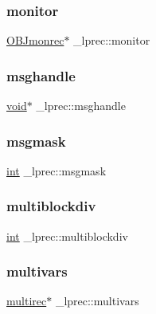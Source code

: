 \subsubsection{\texorpdfstring{monitor}{monitor}}
{\footnotesize\ttfamily \hyperlink{lp__types_8h_a62972be22c422e03180c36608161ece8}{O\+B\+Jmonrec}$\ast$ \+\_\+lprec\+::monitor}

\mbox{\label{struct__lprec_ac60e39a7b37c3089555753cfa4b37094}} 
\subsubsection{\texorpdfstring{msghandle}{msghandle}}
{\footnotesize\ttfamily \hyperlink{lp__lib_8h_ac7828c7b2b31d2e11af17bdb6289c5d9}{void}$\ast$ \+\_\+lprec\+::msghandle}

\mbox{\label{struct__lprec_ab230de61e155fb67739c601ee178a8da}} 
\subsubsection{\texorpdfstring{msgmask}{msgmask}}
{\footnotesize\ttfamily \hyperlink{lp__lib_8h_adeb9ec6400320e4923ac9d836d509ddb}{int} \+\_\+lprec\+::msgmask}

\mbox{\label{struct__lprec_af1376dcf2103cfd6cc58186e7dbaaef2}} 
\subsubsection{\texorpdfstring{multiblockdiv}{multiblockdiv}}
{\footnotesize\ttfamily \hyperlink{lp__lib_8h_adeb9ec6400320e4923ac9d836d509ddb}{int} \+\_\+lprec\+::multiblockdiv}

\mbox{\label{struct__lprec_a1b9d4bd40607dcc891f8c093119398df}} 
\subsubsection{\texorpdfstring{multivars}{multivars}}
{\footnotesize\ttfamily \hyperlink{lp__types_8h_ac33fb087dc930f73c480e6aa191225c6}{multirec}$\ast$ \+\_\+lprec\+::multivars}

